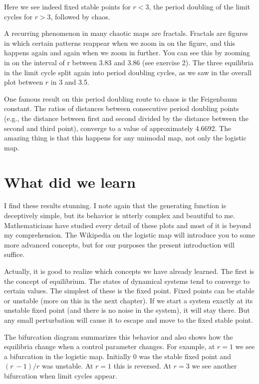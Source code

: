 \documentclass[
  a4paper,
  DIV=11,
  numbers=noendperiod]{scrreprt}
\begin{document}
Here we see indeed fixed stable points for \(r < 3\), the period
doubling of the limit cycles for \(r > 3\), followed by chaos.

A recurring phenomenon in many chaotic maps are fractals. Fractals are
figures in which certain patterns reappear when we zoom in on the
figure, and this happens again and again when we zoom in further. You
can see this by zooming in on the interval of r between 3.83 and 3.86
(see exercise 2). The three equilibria in the limit cycle split again
into period doubling cycles, as we saw in the overall plot between \(r\)
in 3 and 3.5.

One famous result on this period doubling route to chaos is the
Feigenbaum constant. The ratios of distances between consecutive period
doubling points (e.g., the distance between first and second divided by
the distance between the second and third point), converge to a value of
approximately 4.6692. The amazing thing is that this happens for any
unimodal map, not only the logistic map.

\hypertarget{sec-What-did-we-learn}{%
\section{What did we learn}\label{sec-What-did-we-learn}}

I find these results stunning. I note again that the generating function
is deceptively simple, but its behavior is utterly complex and beautiful
to me. Mathematicians have studied every detail of these plots and most
of it is beyond my comprehension. The Wikipedia on the logistic map will
introduce you to some more advanced concepts, but for our purposes the
present introduction will suffice.

Actually, it is good to realize which concepts we have already learned.
The first is the concept of equilibrium. The states of dynamical systems
tend to converge to certain values. The simplest of these is the fixed
point. Fixed points can be stable or unstable (more on this in the next
chapter). If we start a system exactly at its unstable fixed point (and
there is no noise in the system), it will stay there. But any small
perturbation will cause it to escape and move to the fixed stable point.

The bifurcation diagram summarizes this behavior and also shows how the
equilibria change when a control parameter changes. For example, at
\(r = 1\) we see a bifurcation in the logistic map. Initially 0 was the
stable fixed point and \((r\  - 1)/r\) was unstable. At \(r = 1\) this
is reversed. At \(r = 3\) we see another bifurcation when limit cycles
appear.
\end{document}
